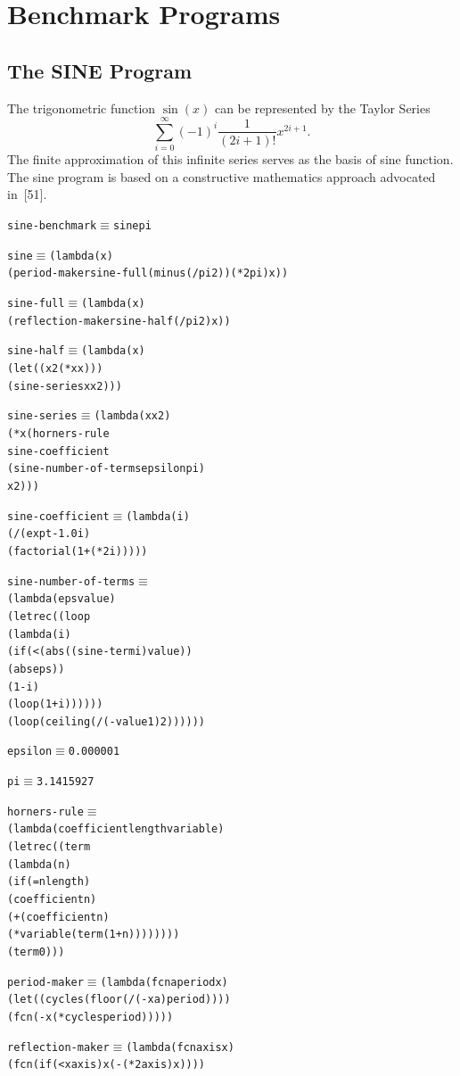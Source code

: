 \chapter{Benchmark Programs}

\section{The SINE Program}

The trigonometric function \(\sin(x)\) can be represented by the Taylor Series
\[
\sum_{i=0}^{\infty}(-1)^i \frac{1}{(2i+1)!}x^{2i+1}.
\]
The finite approximation of this infinite series serves as the basis of sine
function. The sine program is based on a constructive mathematics approach
advocated in~[51].

\begin{alltt}
sine-benchmark \(\equiv\) sine pi

sine \(\equiv\) (lambda (x)
         (period-maker sine-full (minus (/ pi 2)) (* 2 pi) x))

sine-full \(\equiv\) (lambda (x)
              (reflection-maker sine-half (/ pi 2) x))

sine-half \(\equiv\) (lambda (x)
              (let ((x2 (* x x)))
                (sine-series x x2)))

sine-series \(\equiv\) (lambda (x x2)
                (* x (horners-rule
                      sine-coefficient
                      (sine-number-of-terms epsilon pi)
                      x2)))

sine-coefficient \(\equiv\) (lambda (i)
                    (/ (expt -1.0 i)
                       (factorial (1+ (* 2 i)))))

sine-number-of-terms \(\equiv\)
  (lambda (eps value)
    (letrec ((loop
              (lambda (i)
                (if (< (abs ((sine-term i) value))
                       (abs eps))
                    (1- i)
                    (loop (1+ i))))))
      (loop (ceiling (/ (- value 1) 2))))))

epsilon \(\equiv\) 0.000001

pi \(\equiv\) 3.1415927

horners-rule \(\equiv\)
  (lambda (coefficient length variable)
    (letrec ((term
              (lambda (n)
                (if (= n length)
                    (coefficient n)
                    (+ (coefficient n)
                       (* variable (term (1+ n))))))))
      (term 0)))

period-maker \(\equiv\) (lambda (fcn a period x)
                 (let ((cycles (floor (/ (- x a) period))))
                   (fcn (- x (* cycles period)))))

reflection-maker \(\equiv\) (lambda (fcn axis x)
                     (fcn (if (< x axis) x (- (* 2 axis) x))))
\end{alltt}

